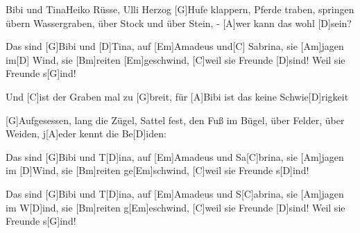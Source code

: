\documentclass[../main.tex]{subfiles}
\begin{document}
\begin{song}[2]{Bibi und Tina}{Heiko Rüsse, Ulli Herzog}{}
[G]Hufe klappern, Pferde traben, springen übern Wassergraben,
über Stock und über Stein, - [A]wer kann das wohl [D]sein?

Das sind [G]Bibi und [D]Tina, auf [Em]Amadeus und[C] Sabrina,
sie [Am]jagen im[D] Wind, sie [Bm]reiten [Em]geschwind,
[C]weil sie Freunde [D]sind! Weil sie Freunde s[G]ind!

Und [C]ist der Graben mal zu [G]breit,
für [A]Bibi ist das keine Schwie[D]rigkeit

[G]Aufgesessen, lang die Zügel, Sattel fest, den Fuß im Bügel,
über Felder, über Weiden, j[A]eder kennt die Be[D]iden:

Das sind [G]Bibi und T[D]ina, auf [Em]Amadeus und Sa[C]brina,
sie [Am]jagen im [D]Wind, sie [Bm]reiten ge[Em]schwind,
[C]weil sie Freunde s[D]ind!

Das sind [G]Bibi und T[D]ina, auf [Em]Amadeus und S[C]abrina,
sie [Am]jagen im W[D]ind, sie [Bm]reiten g[Em]eschwind,
[C]weil sie Freunde [D]sind! Weil sie Freunde s[G]ind!
\end{song}
\end{document}
